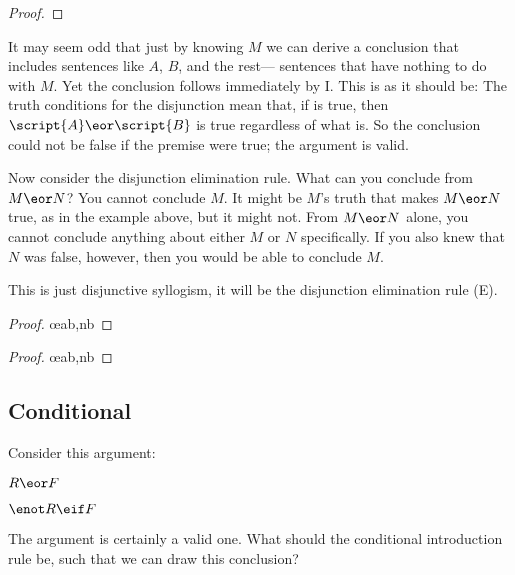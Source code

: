 \begin{proof}
\end{proof}

It may seem odd that just by knowing $M$ we can derive a conclusion that includes sentences like $A$, $B$, and the rest--- sentences that have nothing to do with $M$. Yet the conclusion follows immediately by {\eor}I. This is as it should be: The truth conditions for the disjunction mean that, if  is true, then $\script{A}\eor \script{B}$ is true regardless of what  is. So the conclusion could not be false if the premise were true; the argument is valid.

Now consider the disjunction elimination rule. What can you conclude from $M \eor N$? You cannot conclude $M$. It might be $M$'s truth that makes $M \eor N$ true, as in the example above, but it might not. From $M \eor N$ alone, you cannot conclude anything about either $M$ or $N$ specifically. If you also knew that $N$ was false, however, then you would be able to conclude $M$.

This is just disjunctive syllogism, it will be the disjunction elimination rule ({\eor}E).
\begin{multicols}{2}
\begin{proof}
	 \oe{ab,nb}
\end{proof}

\begin{proof}
	 \oe{ab,nb}
\end{proof}

\end{multicols}

\subsection{Conditional}

Consider this argument:
\begin{earg}
\item[] $R \eor F$
\item[\therefore] $\enot R \eif F$
\end{earg}
The argument is certainly a valid one. What should the conditional introduction rule be, such that we can draw this conclusion?


